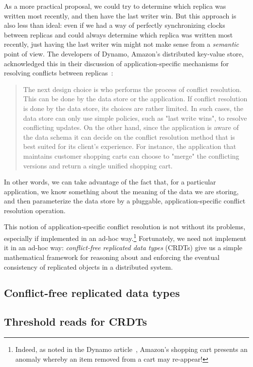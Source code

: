 \documentclass{article}
\begin{document}
As a more practical proposal, we could try to determine which replica
was written most recently, and then have the last writer win.  But
this approach is also less than ideal: even if we had a way of
perfectly synchronizing clocks between replicas and could always
determine which replica was written most recently, just having the
last writer win might not make sense from a \emph{semantic} point of
view.  The developers of Dynamo, Amazon's distributed key-value store,
acknowledged this in their discussion of application-specific
mechanisms for resolving conflicts between replicas~\cite{dynamo}:
\begin{quote}
  The next design choice is who performs the process of conflict
  resolution. This can be done by the data store or the
  application. If conflict resolution is done by the data store, its
  choices are rather limited. In such cases, the data store can only
  use simple policies, such as "last write wins", to resolve
  conflicting updates. On the other hand, since the application is
  aware of the data schema it can decide on the conflict resolution
  method that is best suited for its client’s experience. For
  instance, the application that maintains customer shopping carts can
  choose to "merge" the conflicting versions and return a single
  unified shopping cart.
\end{quote}
In other words, we can take advantage of the fact that, for a
particular application, we know something about the meaning of the
data we are storing, and then parameterize the data store by a
pluggable, application-specific conflict resolution operation.

This notion of application-specific conflict resolution is not without
its problems, especially if implemented in an ad-hoc
way.\footnote{Indeed, as noted in the Dynamo article~\cite{dynamo},
  Amazon's shopping cart presents an anomaly whereby an item removed
  from a cart may re-appear!}  Fortunately, we need not implement it
in an ad-hoc way: \emph{conflict-free replicated data types} (CRDTs)
give us a simple mathematical framework for reasoning about and
enforcing the eventual consistency of replicated objects in a
distributed system.

\subsection{Conflict-free replicated data types}


\subsection{Threshold reads for CRDTs}
\end{document}
